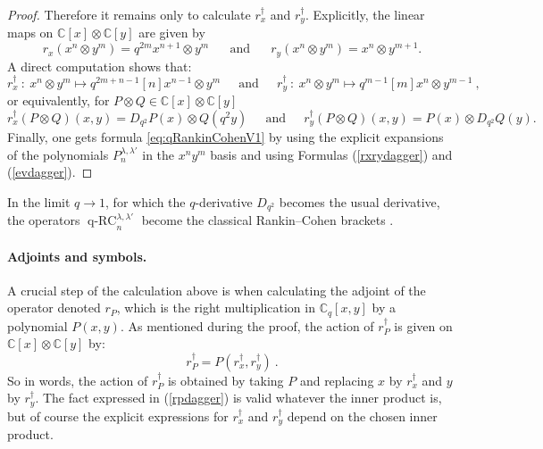 \documentclass[a4paper,12pt]{article}
\numberwithin{equation}{section}
\newcommand{\C}{\mathbb{C}}
\theoremstyle{rem}
\newenvironment{rema}
  {\pushQED{\qed}\renewcommand{\qedsymbol}{$\scriptstyle{\blacktriangle}$}\remax}
  {\popQED\endremax}
\theoremstyle{definition}
\begin{document}
\begin{proof}
Therefore it remains only to calculate $r^\dagger_x$ and $r^\dagger_y$. Explicitly, the linear maps on $\C[x]\otimes \C[y]$ are given by
\[
r_x(x^n\otimes y^m)=q^{2m}x^{n+1}\otimes y^{m}\ \ \ \quad\text{and}\quad\ \ \ r_y(x^n\otimes y^m)=x^n\otimes y^{m+1}.
\]
A direct computation shows that:
\[r_x^\dagger \ :\ x^n\otimes y^m\mapsto q^{2m+n-1}[n]x^{n-1}\otimes y^m\ \ \quad\text{and}\quad\ \ 
r_y^\dagger \ :\ x^n\otimes y^m\mapsto q^{m-1}[m]x^{n}\otimes y^{m-1}\ ,
\]
or equivalently, for $P\otimes Q\in \C[x]\otimes \C[y]$
\begin{equation}\label{rxrydagger}
r_x^\dagger (P\otimes Q)(x,y)=D_{q^2} P(x)\otimes Q(q^2y)\ \ \quad\text{and}\quad\ \ 
r_y^\dagger (P\otimes Q)(x,y)=P(x)\otimes D_{q^2} Q(y).
\end{equation}
Finally, one gets formula \eqref{eq:qRankinCohenV1} by using the explicit 
 expansions of the polynomials $P_n^{\lambda,\lambda'}$ in the $x^ny^m$ basis and using Formulas (\ref{rxrydagger}) and (\ref{evdagger}).
\end{proof}

\begin{rema}
 In the limit $q\to 1$, for which the $q$-derivative $D_{q^2}$ becomes the usual derivative, the operators  $\operatorname{q-RC}^{\lambda,\lambda'}_n$ become the classical Rankin--Cohen brackets \cite{LabrietPoulain24}.
\end{rema}

\paragraph{Adjoints and symbols.} A crucial step of the calculation above is when calculating the adjoint of the operator denoted $r_P$, which is the right multiplication in $\C_q[x,y]$ by a polynomial $P(x,y)$. As mentioned during the proof, the action of $r^{\dagger}_P$ is given on $\C[x]\otimes \C[y]$ by:
\begin{equation}\label{rpdagger}
r^{\dagger}_P=P(r_x^\dagger,r_y^{\dagger})\ .\end{equation}
So in words, the action of $r_P^{\dagger}$ is obtained by taking $P$ and replacing $x$ by $r_x^\dagger$ and $y$ by $r_y^{\dagger}$. The fact expressed in (\ref{rpdagger}) is valid whatever the inner product is, but of course the explicit expressions for $r_x^\dagger$ and $r_y^\dagger$ depend on the chosen inner product.
\end{document}
